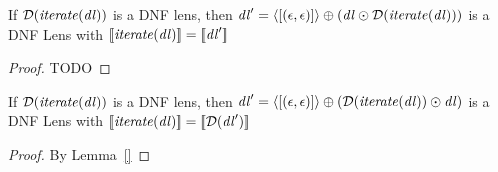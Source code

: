 \documentclass[numbers,10pt,preprint\ifanon ,nocopyrightspace\fi]{sigplanconf}
\begin{document}
\begin{lemma}
  \label{lem:iterate-lens-unroll-left-dnf}
  If $\mathcal{D}(\mathit{\mathit{iterate}(\mathit{dl})})$ is a DNF lens, then
  $\mathit{dl}' = \langle[(\epsilon,\epsilon)]\rangle \oplus (\mathit{dl}
  \odot \mathcal{D}(\mathit{\mathit{iterate}(\mathit{dl})}))$ is a DNF Lens with
  $[ \! [\mathit{\mathit{iterate}(\mathit{dl})}] \! ] = [ \! [\mathit{dl}'] \! ]$
\end{lemma}
\begin{proof}
  TODO
\end{proof}

\begin{lemma}
  \label{lem:iterate-lens-unroll-right-dnf}
  If $\mathcal{D}(\mathit{\mathit{iterate}(\mathit{dl})})$ is a DNF lens, then
  $\mathit{dl}' = \langle[(\epsilon,\epsilon)]\rangle \oplus (\mathcal{D}(\mathit{\mathit{iterate}(\mathit{dl})})
  \odot \mathit{dl})$ is a DNF Lens with
  $[ \! [\mathit{\mathit{iterate}(\mathit{dl})}] \! ] = [ \! [\mathcal{D}(\mathit{dl}')] \! ]$
\end{lemma}
\begin{proof}
  By Lemma~\ref{}
\end{proof}
\end{document}
